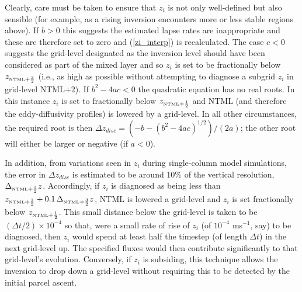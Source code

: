 \documentclass{UMDP_article}
\begin{document}
Clearly, care must be taken to ensure that $z_i$ is not only
well-defined but also sensible (for example, as a rising inversion
encounters more or less stable regions above).  If $b>0$ this suggests
the estimated lapse rates are inappropriate and these are therefore
set to zero and (\ref{zi_interp}) is recalculated.  The case $c<0$
suggests the grid-level designated as the inversion level should have
been considered as part of the mixed layer and so $z_i$ is set to be
fractionally below $z_{\mbox{\tiny \rm NTML}+\frac{3}{2}}$ (\mbox{i.e.}, as high as
possible without attempting to diagnose a subgrid $z_i$ in grid-level
NTML$+2$).  If $b^2-4ac<0$ the quadratic equation has no real roots.
In this instance $z_i$ is set to fractionally below
$z_{\mbox{\tiny \rm NTML}+\frac{1}{2}}$ and NTML (and therefore the eddy-diffusivity
profiles) is lowered by a grid-level.  In all other circumstances, the
required root is then $\Delta z_{disc} = (-b - (b^2-4ac)^{1/2}
)/(2a)$; the other root will either be larger or negative (if $a<0$).

In addition, from variations seen in $z_i$ during single-column model
simulations, the error in $\Delta z_{disc}$ is estimated to be around
10\% of the vertical resolution, $\Delta_{\mbox{\tiny \rm NTML}+\frac{3}{2}} z$.
Accordingly, if $z_i$ is diagnosed as being less than
$z_{\mbox{\tiny \rm NTML}+\frac{1}{2}} + 0.1 \, \Delta_{\mbox{\tiny \rm NTML}+\frac{3}{2}} z$, NTML is
lowered a grid-level and $z_i$ is set fractionally below
$z_{\mbox{\tiny \rm NTML}+\frac{1}{2}}$.  This small distance below the grid-level is
taken to be $(\Delta t/2) \times 10^{-4}$ so that, were a small rate
of rise of $z_i$ (of $10^{-4}$ ms$^{-1}$, say) to be diagnosed, then
$z_i$ would spend at least half the timestep (of length $\Delta t$) in
the next grid-level up.  The specified fluxes would then contribute
significantly to that grid-level's evolution.  Conversely, if $z_i$ is
subsiding, this technique allows the inversion to drop down a
grid-level without requiring this to be detected by the initial parcel
ascent.
 
\end{document}
